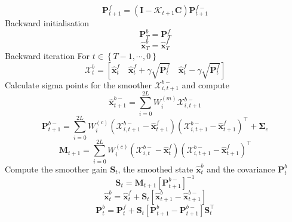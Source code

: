 \documentclass[12pt]{iopart}
\begin{document}
\begin{algorithm}
\begin{algorithmic}[1]
		\begin{equation*}
			\mathbf P_{t+1}^f=(\mathbf I - \mathcal K_{t+1}\mathbf C)\mathbf P_{t +1}^{f-} 
		\end{equation*}
		\State Backward initialisation 
		\begin{equation}
			\mathbf P_T^b= \mathbf P_T^f 
		\end{equation}
		\begin{equation}
			\hat{\mathbf x}^b_T= \hat{\mathbf x}^f_T 
		\end{equation}
		\State Backward iteration For $t \in \left\lbrace T-1, \cdots, 0 \right\rbrace $ 
		\begin{equation*}
			\mathcal X_t^b=[\hat{\mathbf x}_t^f \quad \hat{\mathbf x}_t^f+\gamma\sqrt{\mathbf P_t^f} \quad \hat{\mathbf x}_t^f-\gamma\sqrt{\mathbf P_t^f}] 
		\end{equation*}
		\State Calculate sigma points for the smoother $\mathcal X_{i,t+1}^{b-}$ and compute 
		\begin{equation*}
			\hat{\mathbf x}_{t+1}^{b-}=\sum_{i=0}^{2L} W_i^{(m)}\mathcal X_{i,t+1}^{b-} 
		\end{equation*}
		\begin{equation*}
			\mathbf P_{t +1}^{b-}=\sum_{i=0}^{2L} W_i^{(c)}(\mathcal X_{i,t+1}^{b-}-\hat{\mathbf x}_{t +1}^{f})(\mathcal X_{i,t+1}^{b-}-\hat{\mathbf x}_{t +1}^{f})^\top+\boldsymbol \Sigma_e 
		\end{equation*}
		\begin{equation*}
			\mathbf M_{t +1}=\sum_{i=0}^{2L} W_i^{(c)}(\mathcal X_{i,t}^{b-}-\hat{\mathbf x}_{t}^{f})(\mathcal X_{i,t+1}^{b-}-\hat{\mathbf x}_{t+1}^{f})^\top 
		\end{equation*}
		\State Compute the smoother gain $\mathbf S_t$, the smoothed state $\hat{\mathbf x}_t^b $ and the covariance $\mathbf P_{t}^{b} $ 
		\begin{equation*}
			\mathbf S_t=\mathbf M_{t +1}\left[ \mathbf P_{t +1}^{b-}\right] ^{-1} 
		\end{equation*}
		\begin{equation*}
			\hat{\mathbf x}_t^b=\hat{\mathbf x}_t^f+\mathbf S_t\left[\hat{\mathbf x}_{t+1}^{b}-\hat{\mathbf x}_{t+1}^{b-}\right] 
		\end{equation*}
		\begin{equation*}
			\mathbf P_{t}^{b}=\mathbf P_{t}^{f}+\mathbf S_t\left[\mathbf P_{t+1}^{b}-\mathbf P_{t+1}^{b-} \right]\mathbf S_t^\top 
		\end{equation*}
	\end{algorithmic}
\end{algorithm}
\end{document}

